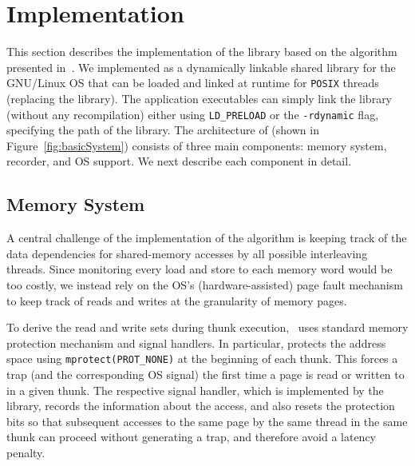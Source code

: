\section{Implementation}
\label{sec:implementation}



This section describes the implementation of the \projecttitle library based on the algorithm presented in~. We implemented \projecttitle as a dynamically linkable shared library for the GNU/Linux OS that can be loaded and linked  at runtime for {\tt POSIX} threads (replacing the \pthreads library). The application executables can simply link the library (without any recompilation) either using {\tt LD\_PRELOAD} or the {\tt -rdynamic} flag, specifying the path of the \projecttitle library. The architecture of \projecttitle (shown in Figure~\ref{fig:basicSystem}) consists of three main components: memory system, recorder, and OS support.  We next describe each component in detail.







\subsection{Memory System}


 A central challenge of the implementation of the algorithm is keeping track of the data dependencies for shared-memory accesses by all possible interleaving threads. Since monitoring every load and store to each memory word would be too costly, we instead rely on the OS's (hardware-assisted) page fault mechanism to keep track of reads and writes at the granularity of memory pages.

To derive the read and write sets during thunk execution,  \projecttitle~uses standard memory protection  mechanism and signal handlers. In particular, \projecttitle protects the address space using {\tt mprotect(PROT\_NONE)} at the beginning of each thunk. This forces a trap (and the corresponding OS signal) the first time a page is read or written to in a given thunk. The respective signal handler, which is implemented by the \projecttitle library, records the information about the access, and also resets the protection bits so that subsequent accesses to the same page by the same thread in the same thunk can proceed without generating a trap, and therefore avoid a
latency penalty.  


